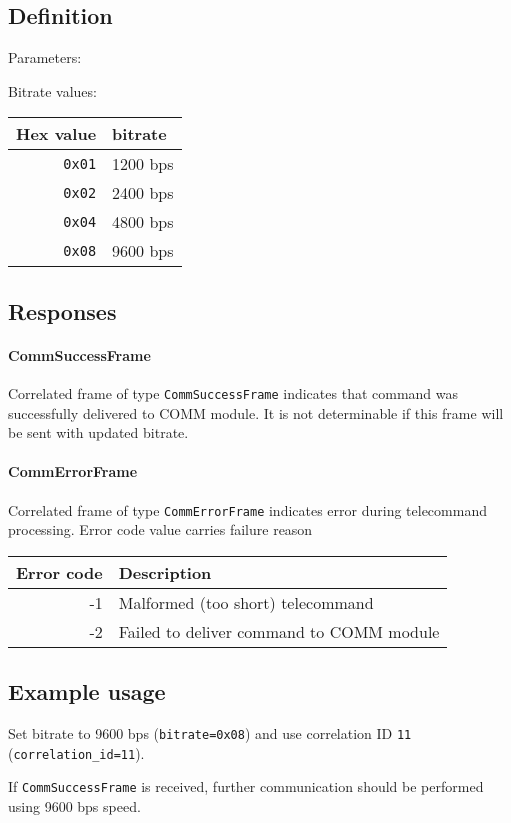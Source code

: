 \subsection{Definition}

Parameters: 

\begin{tcarglist}	
\end{tcarglist}

Bitrate values:

\begin{tabular}{r | l}
	Hex value & bitrate \\ \hline
	\texttt{0x01} & 1200 bps \\
	\texttt{0x02} & 2400 bps \\
	\texttt{0x04} & 4800 bps \\
	\texttt{0x08} & 9600 bps
\end{tabular}


\subsection{Responses}

\paragraph{CommSuccessFrame}

Correlated frame of type \texttt{CommSuccessFrame} indicates that command was successfully delivered to COMM module. It is not determinable if this frame will be sent with updated bitrate.

\paragraph{CommErrorFrame}

Correlated frame of type \texttt{CommErrorFrame} indicates error during telecommand processing. Error code value carries failure reason

\begin{tabular}{r | l}
	Error code & Description \\ \hline
	-1 		& Malformed (too short) telecommand \\
	-2 		& Failed to deliver command to COMM module
\end{tabular}

\subsection{Example usage}
Set bitrate to 9600 bps (\texttt{bitrate=0x08}) and use correlation ID \texttt{11} (\texttt{correlation\_id=11}).


If \texttt{CommSuccessFrame} is received, further communication should be performed using 9600 bps speed.